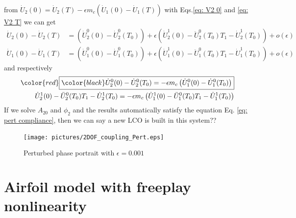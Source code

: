 \documentclass{article}
\begin{document}
from $\dot{U}_2(0)=\dot{U}_2(T)-\epsilon m_c (\dot{U}_1(0)-\dot{U}_1(T))$ with Eqs.\ref{eq: V2 0} and \ref{eq: V2 T} we can get
\begin{align}
    \dot{U}_2(0)-\dot{U}_2(T)&=\left( \dot{U}_2^0(0)-\dot{U}_2^0(T_0)\right)+\epsilon \left(\dot{U}_2^1(0)-\ddot{U}_2^0(T_0)T_1-\dot{U}_2^1(T_0)\right)+o(\epsilon)\\
    \dot{U}_1(0)-\dot{U}_1(T)&=\left( \dot{U}_1^0(0)-\dot{U}_1^0(T_0)\right)+\epsilon \left(\dot{U}_1^1(0)-\ddot{U}_1^0(T_0)T_1 -\dot{U}_1^1(T_0)\right)+o(\epsilon)
\end{align}
%
and respectively
\begin{align}
     \label{eq: init compiliance}
    {\color{red}\boxed{ \color{black}\dot{U}_2^0(0)-\dot{U}_2^0(T_0)=-\epsilon m_c\left( \dot{U}_1^0(0)-\dot{U}_1^0(T_0)\right)}}\\ \label{eq: pert compliance}
    \dot{U}_2^1(0)-\ddot{U}_2^0(T_0)T_1-\dot{U}_2^1(T_0)=-\epsilon m_c \left(\dot{U}_1^1(0)-\ddot{U}_1^0(T_0)T_1 -\dot{U}_1^1(T_0)\right)
\end{align}
If we solve $A_{20}$ and $\phi_2$ and the results automatically satisfy the equation Eq. \ref{eq: pert compliance}, then we can say  a new LCO is built in this system??

\begin{figure}
    \centering
    \texttt{[image: pictures/2DOF\_coupling\_Pert.eps]}
    \caption{Perturbed phase portrait with $\epsilon=0.001$}
    \label{fig:2DOF Pert }
\end{figure}
\section{Airfoil model with freeplay nonlinearity}
\end{document}
